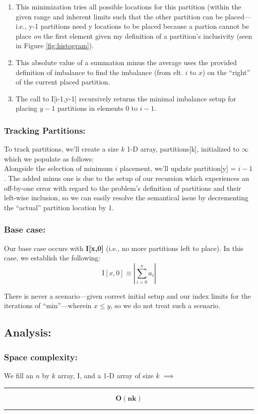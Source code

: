 \documentclass[conference]{styles/acmsiggraph}
\newcommand{\?}{\stackrel{?}{=}}
\begin{document}
\begin{enumerate}
    \item This minimization tries all possible locations for this partition (within the given range and inherent limits such that the other partition can be placed---i.e., y-1 partitions need y locations to be placed because a partion cannot be place \textit{on} the first element given my definition of a partition's inclusivity (seen in Figure \ref{fig:histogram}).
    \item This absolute value of a summation minus the average uses the provided definition of imbalance to find the imbalance (from elt. $i$ to $x$) on the \enquote{right} of the current placed partition.
    \item The call to I[i-1,y-1] recursively returns the minimal imbalance setup for placing $y-1$ partitions in elements $0$ to $i-1$.
\end{enumerate}

\subsubsection*{Tracking Partitions:}
To track partitions, we'll create a size $k$ 1-D array, partitions[k], initialized to $\infty$ which we populate as follows: \\
Alongside the selection of minimum $i$ placement, we'll update partition[y] = $i-1$.  The added minus one is due to the setup of our recursion which experiences an off-by-one error with regard to the problem's definition of partitions and their left-wise inclusion, so we can easily resolve the semantical issue by decrementing the \enquote{actual} partition location by 1.

\subsubsection*{Base case:}
Our base case occurs with \textbf{I[x,0]} (i.e., no more partitions left to place).  In this case, we establish the following:
$$\text{I}[x,0] \equiv \left | \sum^{x}_{i=0} a_i\right |$$


There is never a scenario---given correct initial setup and our index limits for the iterations of \enquote{min}---wherein $x \leq y$, so we do not treat such a scenario.

\subsection{Analysis:}
\subsubsection*{Space complexity:}
We fill an $n$ by $k$ array, I, and a 1-D array of size $k$ $\implies$ \\
\rule{\textwidth}{0.4pt}
$$\mathbf{O(nk)}$$
\rule{\textwidth}{0.4pt}
\end{document}
